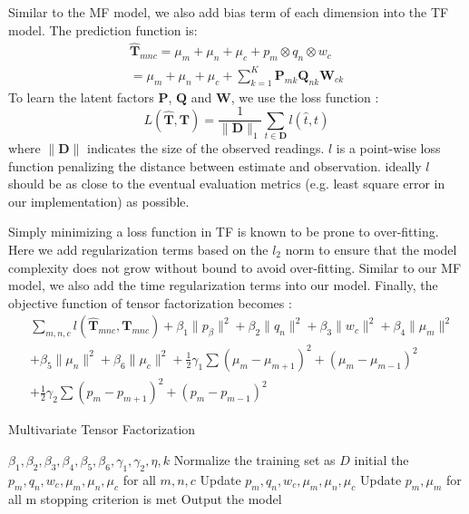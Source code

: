 Similar to the MF model, we also add bias term of each dimension into the TF model. The prediction function is:
\begin{equation*}
\begin{aligned}
\mathbf{\hat{T}}_{mnc}=\mu_m+\mu_n+\mu_c+p_m \otimes q_n\otimes  w_c
\\=\mu_m+\mu_n+\mu_c+\sum\limits_{k=1}^{K}\mathbf{P}_{m k} \mathbf{Q}_{n k} \mathbf{W}_{c k}
\end{aligned}
\end{equation*}
To learn the latent factors $\mathbf{P}$, $\mathbf{Q}$ and $\mathbf{W}$, we use the loss function :
\begin{equation*}
L(\mathbf{\hat{T}},\mathbf{T})=\frac{1}{\|\mathbf{D}\|_1} \sum\limits_{t\in \mathbf{D}}  l(\hat{t},t)
\end{equation*}
where $\|\mathbf{D}\|$ indicates the size of the observed readings.
$l$ is a point-wise loss function penalizing the distance between estimate and observation.
ideally $l$ should be as close to the eventual evaluation metrics (e.g. least square error in our implementation) as possible.

Simply minimizing a loss function in TF is known to be prone to over-fitting. Here we add regularization terms based on the $l_2$ norm to ensure that the model complexity does not grow without bound to avoid over-fitting.
Similar to our MF model, we also add the time regularization terms into our model.
Finally, the objective function of tensor factorization becomes :\\
\begin{equation*}
\begin{aligned}
&\sum\limits_{m, n, c} l( \hat{\mathbf{T}}_{mnc}, \mathbf{T}_{mnc} )+\beta_1\|p_{\beta}\|^2+\beta_2\|q_n\|^2+\beta_3\|w_c\|^2+\beta_4\|
\mu_m\|^2\\
&+\beta_5\|\mu_n\|^2+\beta_6\|\mu_c\|^2+\frac{1}{2}\gamma_1\sum(\mu_m-\mu_{m+1})^2+(\mu_m-\mu_{m-1})^2
\\&
+\frac{1}{2}\gamma_2\sum(p_m-p_{m+1})^2+(p_m-p_{m-1})^2
\end{aligned}
\end{equation*}

\begin{algorithm}[h]
  \caption{Multivariate Tensor Factorization}
  \label{alg::conjugateGradient}
  \begin{algorithmic}[1]
    \Require
    $\beta_1,\beta_2, \beta_3, \beta_4, \beta_5, \beta_6, \gamma_1, \gamma_2, \eta, k$
    \State Normalize the training set as $D$
    \State initial the $p_m, q_n, w_c, \mu_m, \mu_n, \mu_c$ for all $m, n, c$
    \Repeat
      \State Update $p_m, q_n, w_c, \mu_m, \mu_n, \mu_c$ 
     \EndFor
     \State Update $p_m,  \mu_m $ for all m
    \Until stopping criterion is met
    \State Output the model 
  \end{algorithmic}
\end{algorithm}


